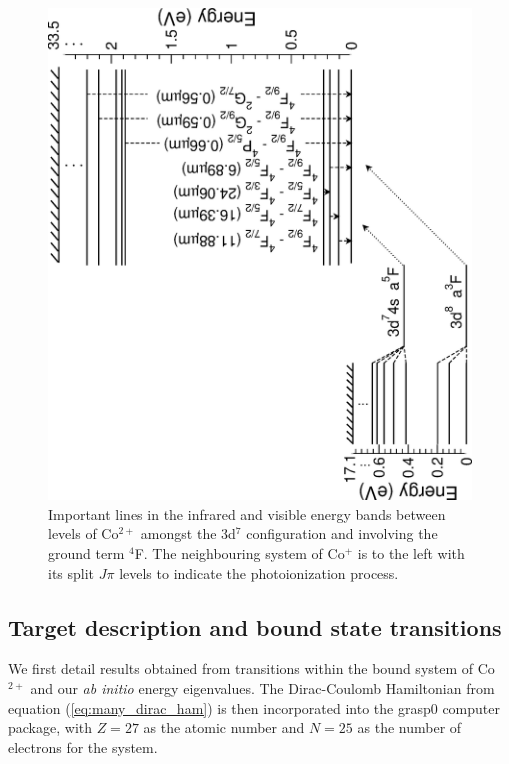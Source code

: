 %
\begin{figure}[h]
\includegraphics[scale=0.59, angle=-90]{Figures/Cobalt/figure1.eps}
\caption{Important lines in the infrared and visible energy bands between levels of Co$^{2+}$ amongst the 3d$^7$ configuration and involving the ground term $^4$F. The neighbouring system of Co$^{+}$ is to the left with its split $J\pi$ levels to indicate the photoionization process. \label{fig:co_transitions}}
\end{figure}
%


\subsection{Target description and bound state transitions}\label{sec:co_target}
We first detail results obtained from transitions within the bound system of Co$^{2+}$ and our {\it ab initio} energy eigenvalues. The Dirac-Coulomb Hamiltonian from equation (\ref{eq:many_dirac_ham}) is then incorporated into the {\sc grasp}0 computer package, with $Z=27$ as the atomic number and $N=25$ as the number of electrons for the system.

